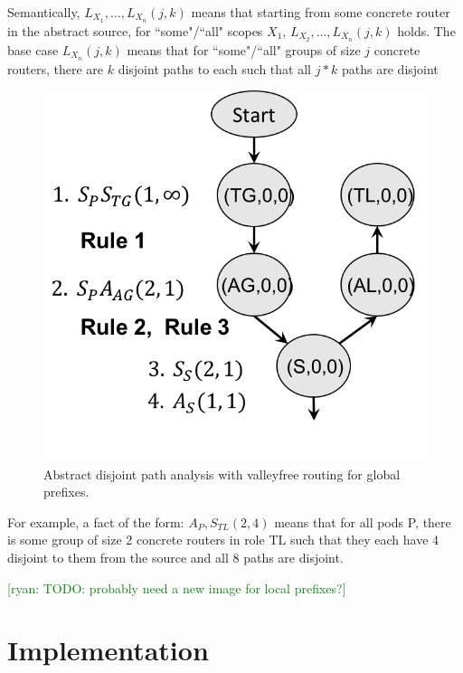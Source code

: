 \documentclass{sig-alternate-10pt}
\newcommand{\ryan}[1]{\textcolor{green}{[ryan: #1]}}
\begin{document}
Semantically, $L_{X_1}, \ldots, L_{X_n}(j,k)$ means that starting from some concrete router in the abstract source, for ``some"/``all" scopes $X_1$, $L_{X_2}, \ldots, L_{X_n}(j,k)$ holds. The base case $L_{X_n}(j,k)$ means that for ``some"/``all" groups of size $j$ concrete routers, there are $k$ disjoint paths to each such that all $j*k$ paths are disjoint

\begin{figure}
  \begin{center}
    \includegraphics[width=.66\columnwidth]{figures/analysis}
  \end{center}
  \caption{Abstract disjoint path analysis with valleyfree routing for global prefixes. \label{fig:compilation-times}}
  \vspace{-1em}
\end{figure}

For example, a fact of the form: $A_P, S_{TL}(2,4)$ means that for all pods P, there is some group of size 2 concrete routers in role TL such that they each have 4 disjoint to them from the source and all 8 paths are disjoint. 

\ryan{TODO: probably need a new image for local prefixes?}

%
%
%
%


\section{Implementation}
\label{sec:implementation}
\end{document}
